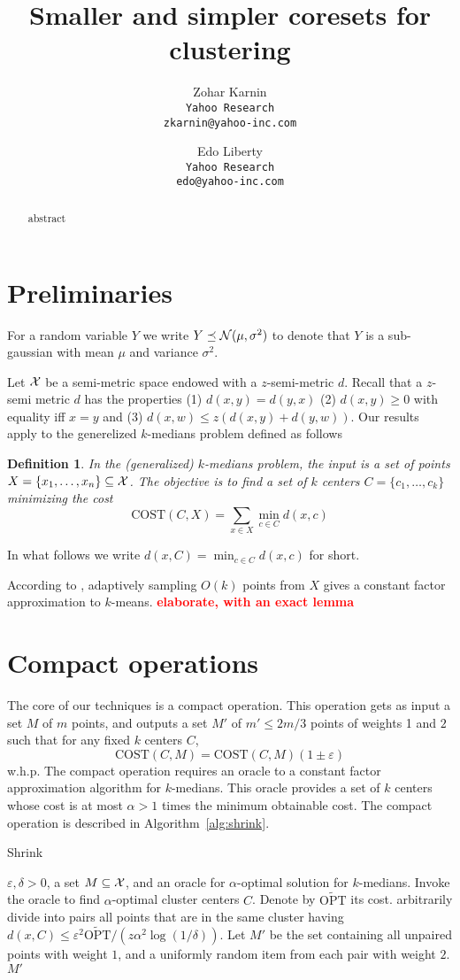 \documentclass[11pt]{article}
\title{Smaller and simpler coresets for clustering}
\author{
Zohar Karnin\\ \texttt{Yahoo Research}\\ \texttt{\small zkarnin@yahoo-inc.com}
\and
Edo Liberty\\ \texttt{Yahoo Research}\\ \texttt{\small edo@yahoo-inc.com}
}
\date\nonumber
\newtheorem{definition} {Definition}
\newcommand{\eps}{\varepsilon}
\newcommand{\note}[1]{\textbf{\textcolor{red}{#1}}}
\newcommand{\cost}{\text{COST}}
\newcommand{\topt}{\widetilde{\text{OPT}}}
\newcommand{\N}{{\cal N}}
\begin{document}
\maketitle

\begin{abstract}
abstract\end{abstract}

\section{Preliminaries}
For a random variable $Y$ we write $Y \preceq \N(\mu,\sigma^2)$ to denote that $Y$ is a sub-gaussian with mean $\mu$ and variance $\sigma^2$.

Let $\cal X$ be a semi-metric space endowed with a $z$-semi-metric $d$. Recall that a $z$-semi metric $d$ has the properties (1) $d(x,y)=d(y,x)$ (2) $d(x,y) \geq 0$ with equality iff $x=y$ and (3) $d(x,w) \leq z(d(x,y)+d(y,w))$. Our results apply to the generelized $k$-medians problem defined as follows
\begin{definition}
In the (generalized) $k$-medians problem, the input is a set of points $X = \{x_1,\ldots,x_n\} \subseteq {\cal X}$. The objective is to find a set of $k$ centers $C = \{c_1,\ldots,c_k\}$ minimizing the cost 
$$\cost(C,X) = \sum_{x \in X} \min_{c \in C} d(x,c)$$
\end{definition}
In what follows we write $d(x,C) = \min_{c \in C}d(x,c)$ for short.

According to \cite{AggarwalDK09}, adaptively sampling $O(k)$ points from $X$ gives a constant factor approximation to $k$-means.
\note{elaborate, with an exact lemma}

\section{Compact operations}
The core of our techniques is a compact operation. This operation gets as input a set $M$ of $m$ points, and outputs a set $M'$ of $m' \leq 2m/3$ points of weights 1 and $2$ such that for any fixed $k$ centers $C$,
$$ \cost(C,M) = \cost(C,M) (1 \pm \eps) $$
w.h.p. The compact operation requires an oracle to a constant factor approximation algorithm for $k$-medians. This oracle provides a set of $k$ centers whose cost is at most $\alpha>1$ times the minimum obtainable cost.
The compact operation is described in Algorithm~\ref{alg:shrink}.


\begin{algorithm} 
\begin{algorithmic}
\caption{Shrink} \label{alg:shrink}
 $\eps,\delta >0$, a set $M \subseteq {\cal X}$, and an oracle for $\alpha$-optimal solution for $k$-medians.
\State Invoke the oracle to find $\alpha$-optimal cluster centers $C$. Denote by $\topt$ its cost.
\State arbitrarily divide into pairs all points that are in the same cluster having $d(x,C) \leq \eps^2 \topt / \left(z \alpha^2 \log(1/\delta)\right)$.
\State Let $M'$ be the set containing all unpaired points with weight $1$, and a uniformly random item from each pair with weight $2$.
 $M'$
\end{algorithmic}
\end{algorithm}
\end{document}
